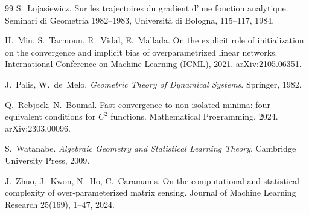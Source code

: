 \documentclass[11pt]{article}
\theoremstyle{definition}
\theoremstyle{remark}
\begin{document}
\begin{thebibliography}{99}
 S.~{\L}ojasiewicz. Sur les trajectoires du gradient d'une fonction analytique. Seminari di Geometria 1982--1983, Universit\`a di Bologna, 115--117, 1984.

 H.~Min, S.~Tarmoun, R.~Vidal, E.~Mallada. On the explicit role of initialization on the convergence and implicit bias of overparametrized linear networks. International Conference on Machine Learning (ICML), 2021. arXiv:2105.06351.

 J.~Palis, W.~de~Melo. \emph{Geometric Theory of Dynamical Systems}. Springer, 1982.

 Q.~Rebjock, N.~Boumal. Fast convergence to non-isolated minima: four equivalent conditions for $C^2$ functions. Mathematical Programming, 2024. arXiv:2303.00096.

 S.~Watanabe. \emph{Algebraic Geometry and Statistical Learning Theory}. Cambridge University Press, 2009.

 J.~Zhuo, J.~Kwon, N.~Ho, C.~Caramanis. On the computational and statistical complexity of over-parameterized matrix sensing. Journal of Machine Learning Research 25(169), 1--47, 2024.

\end{thebibliography}
\end{document}
